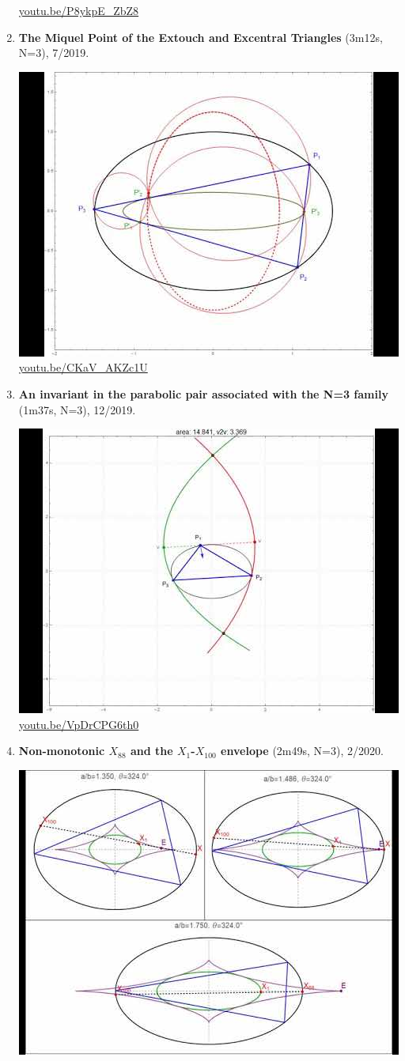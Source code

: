 \documentclass[12pt]{amsart}
\begin{document}
\begin{enumerate}[resume]
\begin{center}
\href{https://youtu.be/P8ykpE_ZbZ8}{\url{youtu.be/P8ykpE\_ZbZ8}}\end{center}
% 
\item \textbf{The Miquel Point of the Extouch and Excentral Triangles} (3m12s, N=3), 7/2019. 
\begin{center}\includegraphics[width=.5\textwidth]{pics/CKaV_AKZc1U.jpg} \\ 
\href{https://youtu.be/CKaV_AKZc1U}{\url{youtu.be/CKaV\_AKZc1U}}\end{center}
% 
\item \textbf{An invariant in the parabolic pair associated with the N=3 family} (1m37s, N=3), 12/2019. 
\begin{center}\includegraphics[width=.5\textwidth]{pics/VpDrCPG6th0.jpg} \\ 
\href{https://youtu.be/VpDrCPG6th0}{\url{youtu.be/VpDrCPG6th0}}\end{center}
% 
\item \textbf{Non-monotonic $X_{88}$ and the $X_{1}$-$X_{100}$ envelope} (2m49s, N=3), 2/2020. 
\begin{center}\includegraphics[width=.5\textwidth]{pics/nJLp--JjDZU.jpg} \\ 

\end{center}
\end{enumerate}
\end{document}
